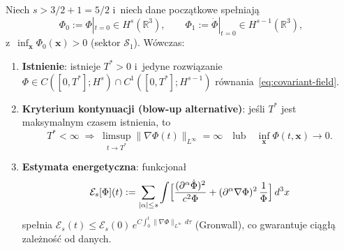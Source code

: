 \begin{theorem}\label{thm:well-posedness}
Niech $s > 3/2 + 1 = 5/2$ i~niech dane pocz\k{a}tkowe spe\l{}niaj\k{a}
\begin{equation}
  \Phi_0 := \Phi|_{t=0} \in H^s(\mathbb{R}^3), \qquad
  \Phi_1 := \dot\Phi|_{t=0} \in H^{s-1}(\mathbb{R}^3),
\end{equation}
z~$\inf_{\mathbf{x}} \Phi_0(\mathbf{x}) > 0$ (sektor $\mathcal{S}_1$).
W\'owczas:
\begin{enumerate}[nosep]
  \item \textbf{Istnienie}: istnieje $T^* > 0$ i~jedyne rozwi\k{a}zanie
    $\Phi \in C([0,T^*]; H^s) \cap C^1([0,T^*]; H^{s-1})$
    r\'ownania~\eqref{eq:covariant-field}.
  \item \textbf{Kryterium kontynuacji (blow-up alternative)}:
    je\'sli $T^*$ jest maksymalnym czasem istnienia, to
    \begin{equation}
      T^* < \infty \;\Longrightarrow\;
      \limsup_{t \to T^*} \bigl\|\nabla\Phi(t)\bigr\|_{L^\infty}
      = \infty
      \quad\text{lub}\quad
      \inf_{\mathbf{x}} \Phi(t,\mathbf{x}) \to 0.
    \end{equation}
  \item \textbf{Estymata energetyczna}: funkcjona\l{}
    \begin{equation}\label{eq:wp-energy}
      \mathcal{E}_s[\Phi](t)
      := \sum_{|\alpha| \le s}
         \int \Bigl[\frac{(\partial^\alpha\dot\Phi)^2}{c^2\Phi}
         + (\partial^\alpha\nabla\Phi)^2\,\frac{1}{\Phi}\Bigr]\,d^3x
    \end{equation}
    spe\l{}nia $\mathcal{E}_s(t) \le \mathcal{E}_s(0)\,
    e^{C\int_0^t \|\nabla\Phi\|_{L^\infty}\,d\tau}$
    (Gronwall), co gwarantuje ci\k{a}g\l{}\k{a} zale\.zno\'s\'c
    od danych.
\end{enumerate}
\end{theorem}

